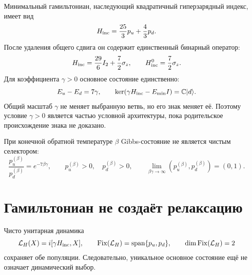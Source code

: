 Минимальный гамильтониан, наследующий квадратичный гиперзарядный индекс,
имеет вид
\begin{equation}
 H_{\rm inc}=\frac{25}{3}p_u+\frac{4}{3}p_d.
 \label{eq:v8-up-down-architecture-hamiltonian}
\end{equation}
После удаления общего сдвига он содержит единственный бинарный оператор:
\begin{equation}
 H_{\rm inc}=\frac{29}{6}I_2+\frac72\sigma_z,\qquad
 H_{\rm inc}^{0}=\frac72\sigma_z.
 \label{eq:v8-up-down-architecture-centered-hamiltonian}
\end{equation}
Для коэффициента $\gamma>0$ основное состояние единственно:
\begin{equation}
 E_u-E_d=7\gamma,\qquad
 \ker(\gamma H_{\rm inc}-E_{\min}I)=\mathbb C|d\rangle.
 \label{eq:v8-up-down-architecture-ground-state}
\end{equation}
Общий масштаб $\gamma$ не меняет выбранную ветвь, но его знак меняет её.
Поэтому условие $\gamma>0$ является частью условной архитектуры, пока
родительское происхождение знака не доказано.

При конечной обратной температуре $\beta$ Gibbs-состояние не является
чистым селектором:
\begin{equation}
 \frac{p_u^{(\beta)}}{p_d^{(\beta)}}=e^{-7\beta\gamma},\qquad
 p_u^{(\beta)}>0,\quad p_d^{(\beta)}>0,\qquad
 \lim_{\beta\gamma\to\infty}(p_u^{(\beta)},p_d^{(\beta)})=(0,1).
 \label{eq:v8-up-down-architecture-gibbs-limit}
\end{equation}

\section{Гамильтониан не создаёт релаксацию}

Чисто унитарная динамика
\begin{equation}
 \mathcal L_H(X)=i[\gamma H_{\rm inc},X],\qquad
 \operatorname{Fix}(\mathcal L_H)
 =\operatorname{span}\{p_u,p_d\},\qquad
 \dim\operatorname{Fix}(\mathcal L_H)=2
 \label{eq:v8-up-down-architecture-unitary-fixed-algebra}
\end{equation}
сохраняет обе популяции. Следовательно, уникальное основное состояние ещё
не означает динамический выбор.

